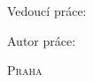 \begin{titlepage}
	\centering

  \vfill

	{\LARGE \skola \par}
	{\Large \fakulta \par}

	\vfill

	{\huge\bfseries \nazev \par}
	{\Large \typPrace \par}

  \vfill

  {\Large Vedoucí práce: \vedouciPrace \par}
	{\Large Autor práce: \autor \par}

	\vspace{1.5cm}

	{\scshape\large Praha \the\year \par}

  \vfill
\end{titlepage}
